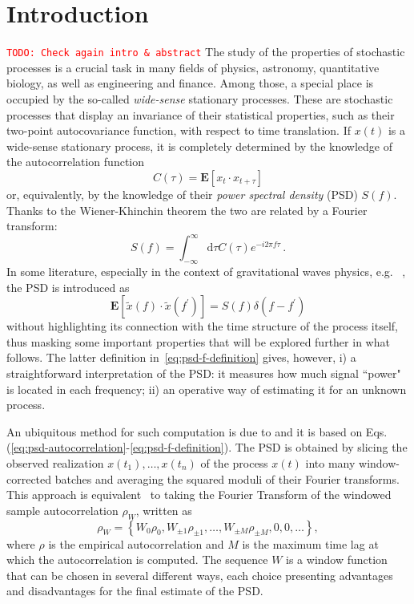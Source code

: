 \documentclass{aa}
\newcommand{\todo}[1]{{\textcolor{red}{\texttt{TODO: #1}} }}
\begin{document}

\section{Introduction}
\todo{Check again intro \& abstract}
The study of the properties of stochastic processes is a crucial task in many fields of physics, astronomy, quantitative biology, as well as engineering and finance. Among those, a special place is occupied by the so-called \textit{wide-sense} stationary processes. These are stochastic processes that display an invariance of their statistical properties, such as their two-point autocovariance function, with respect to time translation. If $x(t)$ is a wide-sense stationary process, it is completely determined by the knowledge of the autocorrelation function 
\begin{equation}
	C(\tau) = \mathbf{E}[x_t \cdot x_{t+\tau}]
\end{equation}
or, equivalently, by the knowledge of their \emph{power spectral density} (PSD) $S(f)$. Thanks to the Wiener-Khinchin theorem the two are related by a Fourier transform: 
\begin{equation}\label{eq:psd-autocorrelation}
	S(f) = \int_{-\infty}^{\infty} \textrm{d}\tau C(\tau) e^{-i 2 \pi f \tau}\,.
\end{equation}
In some literature, especially in the context of gravitational waves physics, e.g. ~\citep{Finn_1992}, the PSD is introduced as  
\begin{equation}\label{eq:psd-f-definition}
	\mathbf{E}[\tilde{x}(f) \cdot \tilde{x}(f^\prime)] = S(f) \delta(f-f^\prime)
\end{equation}
without highlighting its connection with the time structure of the process itself, thus masking some important properties that will be explored further in what follows. The latter definition in~\eqref{eq:psd-f-definition} gives, however, i) a straightforward interpretation of the PSD: it measures how much signal ``power" is located in each frequency; ii) an operative way of estimating it for an unknown process.  

An ubiquitous method for such computation is due to \citet{Welch1967} and it is based on Eqs.(\ref{eq:psd-autocorrelation}-\ref{eq:psd-f-definition}).
The PSD is obtained by slicing the observed realization $x(t_1),\ldots,x(t_n)$ of the process $x(t)$ into many window-corrected batches and averaging the squared moduli of their Fourier transforms.
This approach is equivalent~\citep{Lomb,Scargle} to taking the Fourier Transform of the windowed sample autocorrelation $\rho_W$, written as
\begin{equation}
    \rho_{W} = \left\{W_0\rho_0,W_{\pm 1}\rho_{\pm 1}, \dots, W_{\pm M}\rho_{\pm M}, 0, 0, \dots \right\},
\end{equation}
where $\rho$ is the empirical autocorrelation and $M$ is the maximum time lag at which the autocorrelation is computed.
The sequence $W$ is a window function that can be chosen in several different ways, each choice presenting advantages and disadvantages for the final estimate of the PSD.
\end{document}
